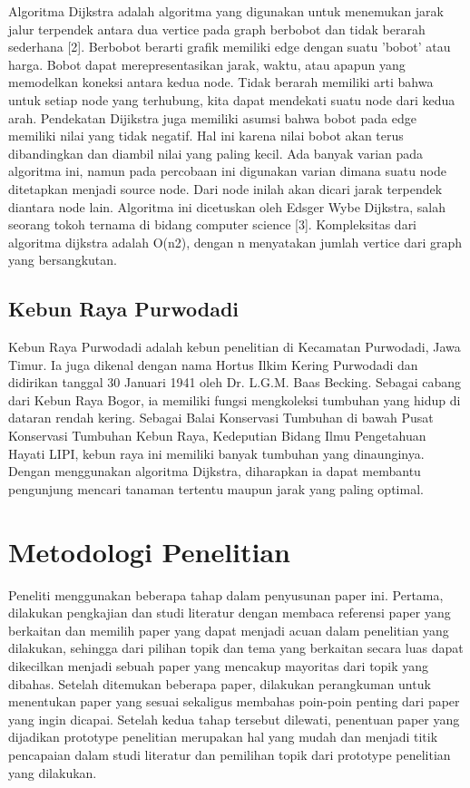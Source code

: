 \documentclass[conference]{IEEEtran}
\begin{document}
Algoritma Dijkstra adalah algoritma yang digunakan untuk
menemukan jarak jalur terpendek antara dua vertice pada
graph berbobot dan tidak berarah sederhana [2]. Berbobot
berarti grafik memiliki edge dengan suatu ’bobot’ atau harga.
Bobot dapat merepresentasikan jarak, waktu, atau apapun
yang memodelkan koneksi antara kedua node. Tidak berarah
memiliki arti bahwa untuk setiap node yang terhubung, kita
dapat mendekati suatu node dari kedua arah. Pendekatan Dijikstra juga memiliki asumsi bahwa bobot pada edge memiliki
nilai yang tidak negatif. Hal ini karena nilai bobot akan
terus dibandingkan dan diambil nilai yang paling kecil. Ada
banyak varian pada algoritma ini, namun pada percobaan
ini digunakan varian dimana suatu node ditetapkan menjadi
source node. Dari node inilah akan dicari jarak terpendek
diantara node lain. Algoritma ini dicetuskan oleh Edsger
Wybe Dijkstra, salah seorang tokoh ternama di bidang computer science [3]. Kompleksitas dari algoritma dijkstra adalah
O(n2), dengan n menyatakan jumlah vertice dari graph yang
bersangkutan.

\subsection{Kebun Raya Purwodadi}
Kebun Raya Purwodadi adalah kebun penelitian di Kecamatan Purwodadi, Jawa Timur. Ia juga dikenal dengan nama
Hortus Ilkim Kering Purwodadi dan didirikan tanggal 30 Januari 1941 oleh Dr. L.G.M. Baas Becking. Sebagai cabang dari
Kebun Raya Bogor, ia memiliki fungsi mengkoleksi tumbuhan
yang hidup di dataran rendah kering. Sebagai Balai Konservasi
Tumbuhan di bawah Pusat Konservasi Tumbuhan Kebun Raya,
Kedeputian Bidang Ilmu Pengetahuan Hayati LIPI, kebun raya
ini memiliki banyak tumbuhan yang dinaunginya. Dengan
menggunakan algoritma Dijkstra, diharapkan ia dapat membantu pengunjung mencari tanaman tertentu maupun jarak
yang paling optimal.

\section{Metodologi Penelitian}

Peneliti menggunakan beberapa tahap dalam penyusunan
paper ini. Pertama, dilakukan pengkajian dan studi literatur
dengan membaca referensi paper yang berkaitan dan memilih
paper yang dapat menjadi acuan dalam penelitian yang dilakukan, sehingga dari pilihan topik dan tema yang berkaitan
secara luas dapat dikecilkan menjadi sebuah paper yang mencakup mayoritas dari topik yang dibahas. Setelah ditemukan
beberapa paper, dilakukan perangkuman untuk menentukan
paper yang sesuai sekaligus membahas poin-poin penting
dari paper yang ingin dicapai. Setelah kedua tahap tersebut
dilewati, penentuan paper yang dijadikan prototype penelitian
merupakan hal yang mudah dan menjadi titik pencapaian
dalam studi literatur dan pemilihan topik dari prototype penelitian yang dilakukan.
\end{document}
